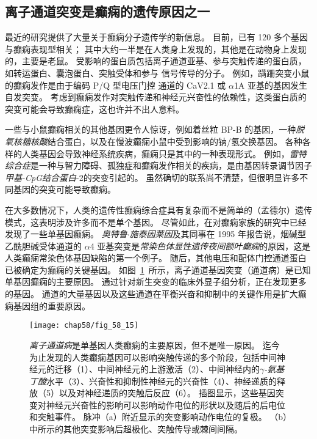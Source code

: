 \subsection{离子通道突变是癫痫的遗传原因之一}

最近的研究提供了大量关于癫痫分子遗传学的新信息。
目前，已有 120 多个基因与癫痫表现型相关；
其中大约一半是在人类身上发现的，其他是在动物身上发现的，主要是老鼠。
受影响的蛋白质包括离子通道亚基、参与突触传递的蛋白质，如转运蛋白、囊泡蛋白、突触受体和参与  信号传导的分子。
例如，蹒跚突变小鼠的癫痫发作是由于编码 P/Q 型电压门控  通道的 CaV2.1 或 $\alpha$1A 亚基的基因发生自发突变。
考虑到癫痫发作对突触传递和神经元兴奋性的依赖性，这类蛋白质的突变可能会导致癫痫症，这也许并不出人意料。


一些与小鼠癫痫相关的其他基因更令人惊讶，例如着丝粒 BP-B 的基因，一种\textit{脱氧核糖核酸}结合蛋白，以及在慢波癫痫小鼠中受到影响的钠/氢交换基因。
各种各样的人类基因会导致神经系统疾病，癫痫只是其中的一种表现形式。
例如，\textit{雷特综合症}是一种与智力障碍、孤独症和癫痫发作相关的疾病，是由基因转录调节因子\textit{甲基-CpG结合蛋白}-2的突变引起的。
虽然确切的联系尚不清楚，但很明显许多不同基因的突变可能导致癫痫。


在大多数情况下，人类的遗传性癫痫综合症具有复杂而不是简单的（孟德尔）遗传模式，这表明涉及许多而不是单个基因。
尽管如此，在对癫痫家族的研究中已经发现了一些单基因癫痫。
\textit{奥特鲁$\cdot$施泰因莱因}及其同事在 1995 年报告说，烟碱型乙酰胆碱受体通道的 $\alpha$4 亚基突变是\textit{常染色体显性遗传夜间额叶癫痫}的原因，这是人类癫痫常染色体基因缺陷的第一个例子。
随后，其他电压和配体门控通道蛋白已被确定为癫痫的关键基因。
如图~\ref{fig:58_15}~所示，离子通道基因突变（通道病）是已知单基因癫痫的主要原因。
通过针对新生突变的临床外显子组分析，正在发现更多的基因。
 通道的大量基因以及这些通道在平衡兴奋和抑制中的关键作用是扩大癫痫基因组的重要原因。


\begin{figure}[htbp]
	\centering
	\texttt{[image: chap58/fig\_58\_15]}
	\caption{\textit{离子通道病}是单基因人类癫痫的主要原因，但不是唯一原因。
		迄今为止发现的人类癫痫基因可以影响突触传递的多个阶段，包括中间神经元的迁移（1）、中间神经元的上游激活（2）、中间神经内的\textit{$\gamma$-氨基丁酸}水平（3）、兴奋性和抑制性神经元的兴奋性（4）、神经递质的释放（5）以及对神经递质的突触后反应（6）。
		插图显示，这些基因突变对神经元兴奋性的影响可以影响动作电位的形状以及随后的后电位和突触事件。
		脉冲（a）附近显示的突变影响动作电位的复极。
		（b）中所示的其他突变影响后超极化、突触传导或棘间间隔。}
	\label{fig:58_15}
\end{figure}



